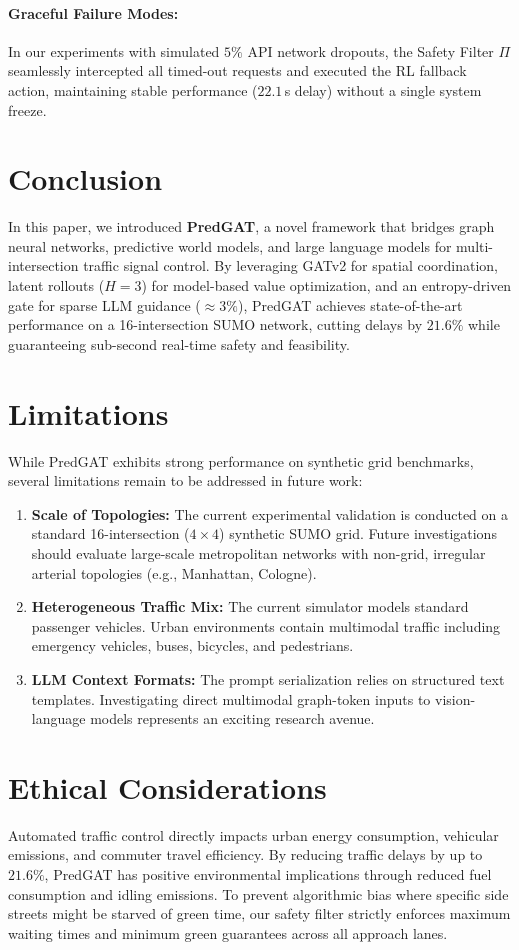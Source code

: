 \documentclass[11pt,a4paper]{article}
\begin{document}
\paragraph{Graceful Failure Modes:} In our experiments with simulated $5\%$ API network dropouts, the Safety Filter $\Pi$ seamlessly intercepted all timed-out requests and executed the RL fallback action, maintaining stable performance ($22.1$\,s delay) without a single system freeze.

\section{Conclusion}
\label{sec:conclusion}
In this paper, we introduced \textbf{PredGAT}, a novel framework that bridges graph neural networks, predictive world models, and large language models for multi-intersection traffic signal control. By leveraging GATv2 for spatial coordination, latent rollouts ($H=3$) for model-based value optimization, and an entropy-driven gate for sparse LLM guidance ($\approx 3\%$), PredGAT achieves state-of-the-art performance on a 16-intersection SUMO network, cutting delays by $21.6\%$ while guaranteeing sub-second real-time safety and feasibility.

\section*{Limitations}
While PredGAT exhibits strong performance on synthetic grid benchmarks, several limitations remain to be addressed in future work:
\begin{enumerate}
    \item \textbf{Scale of Topologies:} The current experimental validation is conducted on a standard 16-intersection ($4\times4$) synthetic SUMO grid. Future investigations should evaluate large-scale metropolitan networks with non-grid, irregular arterial topologies (e.g., Manhattan, Cologne).
    \item \textbf{Heterogeneous Traffic Mix:} The current simulator models standard passenger vehicles. Urban environments contain multimodal traffic including emergency vehicles, buses, bicycles, and pedestrians.
    \item \textbf{LLM Context Formats:} The prompt serialization relies on structured text templates. Investigating direct multimodal graph-token inputs to vision-language models represents an exciting research avenue.
\end{enumerate}

\section*{Ethical Considerations}
Automated traffic control directly impacts urban energy consumption, vehicular emissions, and commuter travel efficiency. By reducing traffic delays by up to $21.6\%$, PredGAT has positive environmental implications through reduced fuel consumption and idling emissions. To prevent algorithmic bias where specific side streets might be starved of green time, our safety filter strictly enforces maximum waiting times and minimum green guarantees across all approach lanes.
\end{document}
